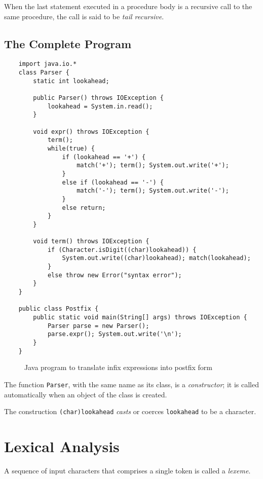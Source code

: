 \documentclass[a4paper,twoside]{book}
\begin{document}
When the last statement executed in a procedure body is a recursive call to the same procedure, the call is said to be \textit{tail recursive}.

\subsection{The Complete Program}

\begin{Verbatim}
    import java.io.*
    class Parser {
        static int lookahead;

        public Parser() throws IOException {
            lookahead = System.in.read();
        }

        void expr() throws IOException {
            term();
            while(true) {
                if (lookahead == '+') {
                    match('+'); term(); System.out.write('+');
                }
                else if (lookahead == '-') {
                    match('-'); term(); System.out.write('-');
                }
                else return;
            }
        }

        void term() throws IOException {
            if (Character.isDigit((char)lookahead)) {
                System.out.write((char)lookahead); match(lookahead);
            }
            else throw new Error("syntax error");
        }
    }

    public class Postfix {
        public static void main(String[] args) throws IOException {
            Parser parse = new Parser();
            parse.expr(); System.out.write('\n');
        }
    }
\end{Verbatim}
\begin{figure}[htbp]
    \caption{Java program to translate infix expressions into postfix form}
    \label{Figure:2.27}
\end{figure}

The function \verb|Parser|, with the same name as its class, is a \textit{constructor}; it is called automatically when an object of the class is created.

The construction \verb|(char)lookahead| \textit{casts} or coerces \verb|lookahead| to be a character.

\section{Lexical Analysis}

A sequence of input characters that comprises a single token is called a \textit{lexeme}.
\end{document}
